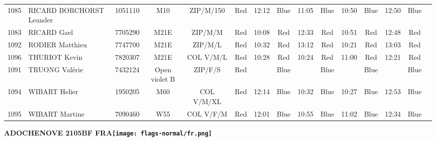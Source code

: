 \documentclass{report}
\begin{document}
\begin{longtable}{|c|l|r|c|c|*{5}{cc|}}
    1085 & RICARD BORCHORST Leander & 1051110 & M10 & ZIP/M/150 & Red & 12:12 & Blue & 11:05 & Blue & 10:50 & Blue & 12:50 & Blue &  \\
    1083 & RICARD Gael & 7705290 & M21E & ZIP/M/M & Red & 10:08 & Red & 12:33 & Red & 10:51 & Red & 12:48 & Red &  \\
    1092 & RODIER Matthieu & 7747700 & M21E & ZIP/M/L & Red & 10:32 & Red & 13:12 & Red & 10:21 & Red & 13:03 & Red &  \\
    1096 & THURIOT Kevin & 7820307 & M21E & COL V/M/L & Red & 10:28 & Red & 10:24 & Red & 11:00 & Red & 12:21 & Red &  \\
    1091 & TRUONG Valérie & 7432124 & Open violet B & ZIP/F/S & Red &   & Blue &   & Blue &   & Blue &   & Blue &  \\
    1094 & WIBART Helier & 1950205 & M60 & COL V/M/XL & Red & 12:14 & Blue & 10:32 & Blue & 10:27 & Blue & 12:53 & Blue &  \\
    1095 & WIBART Martine & 7090460 & W55 & COL V/F/M & Red & 12:01 & Blue & 10:55 & Blue & 11:02 & Blue & 12:34 & Blue &  \\
  \end{longtable}
\newpage
  \Huge \centering \bfseries ADOCHENOVE 2105BF FRA\normalfont \footnotesize \sffamily \hfill \texttt{[image: flags-normal/fr.png]} \newline 
\end{document}
